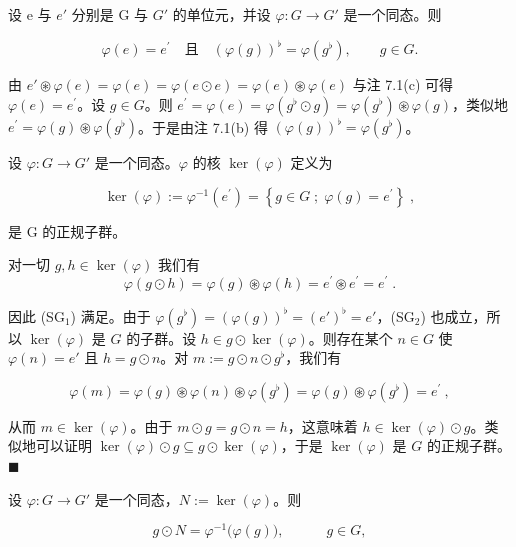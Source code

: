 \begin{remark}

\begin{items}
\item

设 e 与 $ e' $ 分别是 G 与 $ G' $ 的单位元，并设 $ \varphi: G \to G' $ 是一个同态。则

\[
\varphi(e)=e^{\prime}\quad\text{且}\quad\left(\varphi(g)\right)^{\flat}=\varphi(g^{\flat}),\qquad g\in G.
\]

\proofhead
由 $e'\circledast\varphi(e)=\varphi(e)=\varphi(e\odot e)=\varphi(e)\circledast\varphi(e)$ 与注 7.1(c) 可得 $\varphi(e)=e^{\prime}$。设 $g\in G$。则 $e^{\prime}=\varphi(e)=\varphi(g^{\flat}\odot g)=\varphi(g^{\flat})\circledast\varphi(g)$，类似地 $e^{\prime}=\varphi(g)\circledast\varphi(g^{\flat})$。于是由注 7.1(b) 得 $\left(\varphi(g)\right)^{\flat}=\varphi(g^{\flat})$。
\item

设 $ \varphi: G \to G' $ 是一个同态。$ \varphi $ 的核 $ \ker(\varphi) $ 定义为

\[
\ker(\varphi):=\varphi^{-1}(e^{\prime})=\left\{g\in G\;;\;\varphi(g)=e^{\prime}\right\}\;,
\]

是 G 的正规子群。

\proofhead
对一切 $ g, h \in \ker(\varphi) $ 我们有
\[
\varphi(g\odot h)=\varphi(g)\circledast\varphi(h)=e^{\prime}\circledast e^{\prime}=e^{\prime}\;.
\]

因此 (SG$_1$) 满足。由于 $ \varphi(g^{\flat}) = (\varphi(g))^{\flat} = (e')^{\flat} = e' $，(SG$_2$) 也成立，所以 $ \ker(\varphi) $ 是 $ G $ 的子群。设 $ h \in g \odot \ker(\varphi) $。则存在某个 $ n \in G $ 使 $ \varphi(n) = e' $ 且 $ h = g \odot n $。对 $ m := g \odot n \odot g^{\flat} $，我们有

\[
\varphi(m)=\varphi(g)\circledast\varphi(n)\circledast\varphi(g^{\flat})=\varphi(g)\circledast\varphi(g^{\flat})=e^{\prime}~,
\]

从而 $ m \in \ker(\varphi) $。由于 $ m \odot g = g \odot n = h $，这意味着 $ h \in \ker(\varphi) \odot g $。类似地可以证明 $ \ker(\varphi) \odot g \subseteq g \odot \ker(\varphi) $，于是 $ \ker(\varphi) $ 是 $ G $ 的正规子群。$ \blacksquare $

\item

设 $ \varphi: G \to G' $ 是一个同态，$ N := \ker(\varphi) $。则

\[
g\odot N=\varphi^{-1}\bigl(\varphi(g)\bigr),\qquad\quad g\in G,
\]


\end{items}
\end{remark}
